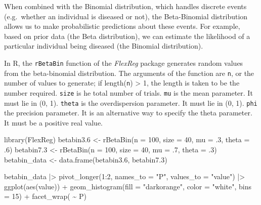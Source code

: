 \documentclass[
  letterpaper,
  DIV=11,
  numbers=noendperiod]{scrreprt}
\newenvironment{Shaded}{\begin{snugshade}}{\end{snugshade}}
\newcommand{\AttributeTok}[1]{\textcolor[rgb]{0.40,0.45,0.13}{#1}}
\newcommand{\DecValTok}[1]{\textcolor[rgb]{0.68,0.00,0.00}{#1}}
\newcommand{\FloatTok}[1]{\textcolor[rgb]{0.68,0.00,0.00}{#1}}
\newcommand{\FunctionTok}[1]{\textcolor[rgb]{0.28,0.35,0.67}{#1}}
\newcommand{\NormalTok}[1]{\textcolor[rgb]{0.00,0.23,0.31}{#1}}
\newcommand{\OtherTok}[1]{\textcolor[rgb]{0.00,0.23,0.31}{#1}}
\newcommand{\SpecialCharTok}[1]{\textcolor[rgb]{0.37,0.37,0.37}{#1}}
\newcommand{\StringTok}[1]{\textcolor[rgb]{0.13,0.47,0.30}{#1}}
\begin{document}
When combined with the Binomial distribution, which handles discrete
events (e.g.~whether an individual is diseased or not), the
Beta-Binomial distribution allows us to make probabilistic predictions
about these events. For example, based on prior data (the Beta
distribution), we can estimate the likelihood of a particular individual
being diseased (the Binomial distribution).

In R, the \texttt{rBetaBin} function of the \emph{FlexReg} package
generates random values from the beta-binomial distribution. The
arguments of the function are \texttt{n}, or the number of values to
generate; if length(\texttt{n}) \textgreater{} 1, the length is taken to
be the number required. \texttt{size} is he total number of trials.
\texttt{mu} is the mean parameter. It must lie in (0, 1). \texttt{theta}
is the overdispersion parameter. It must lie in (0, 1). \texttt{phi} the
precision parameter. It is an alternative way to specify the theta
parameter. It must be a positive real value.

\begin{Shaded}
\begin{Highlighting}[]
\FunctionTok{library}\NormalTok{(FlexReg) }
\NormalTok{betabin3}\FloatTok{.6} \OtherTok{\textless{}{-}} \FunctionTok{rBetaBin}\NormalTok{(}\AttributeTok{n =} \DecValTok{100}\NormalTok{, }\AttributeTok{size =} \DecValTok{40}\NormalTok{, }\AttributeTok{mu =}\NormalTok{ .}\DecValTok{3}\NormalTok{, }\AttributeTok{theta =}\NormalTok{ .}\DecValTok{6}\NormalTok{)}
\NormalTok{betabin7}\FloatTok{.3} \OtherTok{\textless{}{-}} \FunctionTok{rBetaBin}\NormalTok{(}\AttributeTok{n =} \DecValTok{100}\NormalTok{, }\AttributeTok{size =} \DecValTok{40}\NormalTok{, }\AttributeTok{mu =}\NormalTok{ .}\DecValTok{7}\NormalTok{, }\AttributeTok{theta =}\NormalTok{ .}\DecValTok{3}\NormalTok{)}
\NormalTok{betabin\_data }\OtherTok{\textless{}{-}} \FunctionTok{data.frame}\NormalTok{(betabin3}\FloatTok{.6}\NormalTok{, betabin7}\FloatTok{.3}\NormalTok{)}
\end{Highlighting}
\end{Shaded}

\begin{Shaded}
\begin{Highlighting}[]
\NormalTok{betabin\_data }\SpecialCharTok{|\textgreater{}}
  \FunctionTok{pivot\_longer}\NormalTok{(}\DecValTok{1}\SpecialCharTok{:}\DecValTok{2}\NormalTok{, }\AttributeTok{names\_to =} \StringTok{"P"}\NormalTok{,}
               \AttributeTok{values\_to =} \StringTok{"value"}\NormalTok{) }\SpecialCharTok{|\textgreater{}}
  \FunctionTok{ggplot}\NormalTok{(}\FunctionTok{aes}\NormalTok{(value)) }\SpecialCharTok{+}
  \FunctionTok{geom\_histogram}\NormalTok{(}\AttributeTok{fill =} \StringTok{"darkorange"}\NormalTok{,}
                 \AttributeTok{color =} \StringTok{"white"}\NormalTok{,}
                 \AttributeTok{bins =} \DecValTok{15}\NormalTok{) }\SpecialCharTok{+}
  \FunctionTok{facet\_wrap}\NormalTok{( }\SpecialCharTok{\textasciitilde{}}\NormalTok{ P) }
\end{Highlighting}
\end{Shaded}
\end{document}
